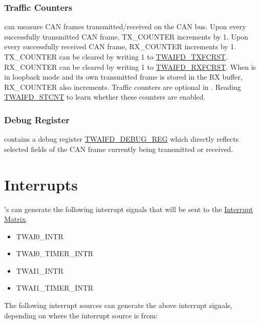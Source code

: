 \documentclass[main\_\_EN.tex]{subfiles}
\begin{document}
\subsubsection{Traffic Counters}

\modulename{} can measure CAN frames transmitted/received on the CAN bus. Upon every successfully transmitted CAN frame, TX\_COUNTER increments by 1. Upon every successfully received CAN frame, RX\_COUNTER increments by 1. TX\_COUNTER can be cleared by writing 1 to \hyperref[fielddesc:TWAIFDTXFCRST]{TWAIFD\_TXFCRST}. RX\_COUNTER can be cleared by writing 1 to \hyperref[fielddesc:TWAIFDRXFCRST]{TWAIFD\_RXFCRST}. When \modulename{} is in loopback mode and its own transmitted frame is stored in the RX buffer, RX\_COUNTER also increments. Traffic counters are optional in \modulename{}. Reading \hyperref[fielddesc:TWAIFDSTCNT]{TWAIFD\_STCNT} to learn whether these counters are enabled.

\subsubsection{Debug Register}

\modulename{} contains a debug register \hyperref[regdesc:TWAIFDDEBUGREG]{TWAIFD\_DEBUG\_REG} which directly reflects selected fields of the CAN frame currently being transmitted or received.



\section{Interrupts}\label{sec:twai-interrupt}

\chipname{}'s \modulename{} can generate the following interrupt signals that will be sent to the \hyperref[mod:intmtrx]{Interrupt Matrix}.

    \begin{itemize}
        \item TWAI0\_INTR
        \item TWAI0\_TIMER\_INTR
        \item TWAI1\_INTR
        \item TWAI1\_TIMER\_INTR
    \end{itemize}

The following interrupt sources can generate the above interrupt signals, depending on where the interrupt source is from:
\end{document}
